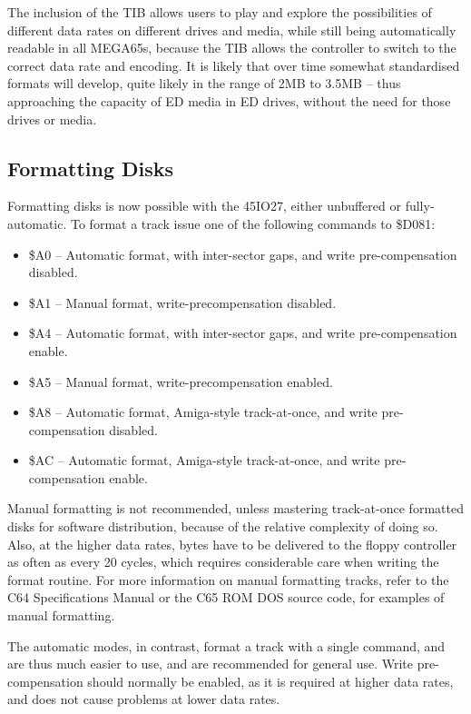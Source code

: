 The inclusion of the TIB allows users to play and explore the possibilities of different data rates
on different drives and media, while still being automatically readable in all MEGA65s, because the
TIB allows the controller to switch to the correct data rate and encoding.  It is likely that over
time somewhat standardised formats will develop, quite likely in the range of 2MB to 3.5MB -- thus
approaching the capacity of ED media in ED drives, without the need for those drives or media.

\subsection{Formatting Disks}

Formatting disks is now possible with the 45IO27, either unbuffered or fully-automatic.
To format a track issue one of the following commands to \$D081:

\begin{itemize}
\item \$A0 -- Automatic format, with inter-sector gaps, and write pre-compensation disabled.
\item \$A1 -- Manual format, write-precompensation disabled.
\item \$A4 -- Automatic format, with inter-sector gaps, and write pre-compensation enable.
\item \$A5 -- Manual format, write-precompensation enabled.
\item \$A8 -- Automatic format, Amiga-style track-at-once, and write pre-compensation disabled.
\item \$AC -- Automatic format, Amiga-style track-at-once, and write pre-compensation enable.
\end{itemize}

Manual formatting is not recommended, unless mastering track-at-once formatted disks for software
distribution, because of the relative complexity of doing so. Also, at the higher data rates,
bytes have to be delivered to the floppy controller as often as every 20 cycles, which requires
considerable care when writing the format routine.
For more information on manual formatting tracks, refer to the C64 Specifications Manual or the
C65 ROM DOS source code, for examples of manual formatting.

The automatic modes, in contrast, format a track with a single command, and are thus much easier to use,
and are recommended for general use.  Write pre-compensation should normally be enabled, as it is
required at higher data rates, and does not cause problems at lower data rates.

